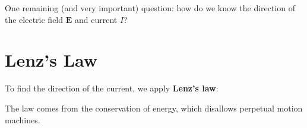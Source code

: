One remaining (and very important) question: how do we know the
direction of the electric field $\bm E$ and current $I$?
%
%
%
\section{Lenz's Law}
To find the direction of the current, we apply \textbf{Lenz's law}:
\begin{center}
\end{center}
The law comes from the conservation of energy, which disallows perpetual
motion machines.

%
%
%





